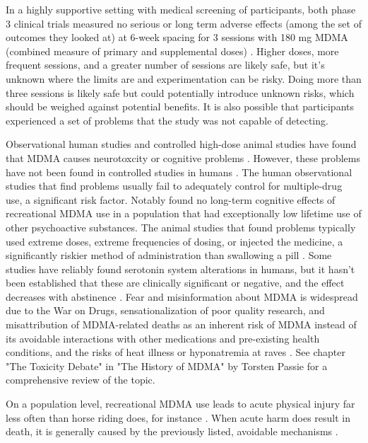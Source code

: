 \documentclass[12pt,letterpaper]{article}
\begin{document}
In a highly supportive setting with medical screening of participants, both phase 3 clinical trials measured no serious or long term adverse effects (among the set of outcomes they looked at) at 6-week spacing for 3 sessions with 180 mg MDMA (combined measure of primary and supplemental doses) \cite{mitchellMDMAClinicalTrial,mitchellMDMAClinicalTrial2}. Higher doses, more frequent sessions, and a greater number of sessions are likely safe, but it's unknown where the limits are and experimentation can be risky. Doing more than three sessions is likely safe but could potentially introduce unknown risks, which should be weighed against potential benefits. It is also possible that participants experienced a set of problems that the study was not capable of detecting.

Observational human studies and controlled high-dose animal studies have found that MDMA causes neurotoxcity or cognitive problems \cite{passieHistory}. However, these problems have not been found in controlled studies in humans \cite{halpernMormonRavers,mitchellMDMAClinicalTrial}. The human observational studies that find problems usually fail to adequately control for multiple-drug use, a significant risk factor. Notably \textcite{halpernMormonRavers} found no long-term cognitive effects of recreational MDMA use in a population that had exceptionally low lifetime use of other psychoactive substances. The animal studies that found problems typically used extreme doses, extreme frequencies of dosing, or injected the medicine, a significantly riskier method of administration than swallowing a pill \cite{passieHistory}. Some studies have reliably found serotonin system alterations in humans, but it hasn't been established that these are clinically significant or negative, and the effect decreases with abstinence \cite{gouzoulis2006neurotoxicity}. Fear and misinformation about MDMA is widespread due to the War on Drugs, sensationalization of poor quality research, and misattribution of MDMA-related deaths as an inherent risk of MDMA instead of its avoidable interactions with other medications and pre-existing health conditions, and the risks of heat illness or hyponatremia at raves \cite{passieHistory}. See chapter "The Toxicity Debate" in "The History of MDMA" by Torsten Passie for a comprehensive review of the topic.

On a population level, recreational MDMA use leads to acute physical injury far less often than horse riding does, for instance \cite{nutt2009equasy}. When acute harm does result in death, it is generally caused by the previously listed, avoidable mechanisms \cite{riggDeaths}.
\end{document}
